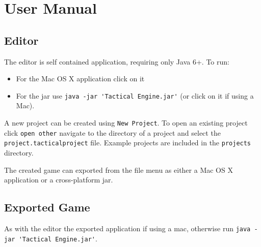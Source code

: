\section{User Manual}

\subsection{Editor}
The editor is self contained application, requiring only Java 6+.  To run:
\begin{itemize}
	\item For the Mac OS X application click on it
	\item For the jar use \lstinline{java -jar 'Tactical Engine.jar'} (or click on it if using a Mac).
\end{itemize}

\noindent A new project can be created using \texttt{New Project}. To open an existing project click \texttt{open other} navigate to the directory of a project and select the \texttt{project.tacticalproject} file. Example projects are included in the \texttt{projects} directory.

The created game can exported from the file menu as either a Mac OS X application or a cross-platform jar.

\subsection{Exported Game}
As with the editor the exported application if using a mac, otherwise run \lstinline{java -jar 'Tactical Engine.jar'}.

